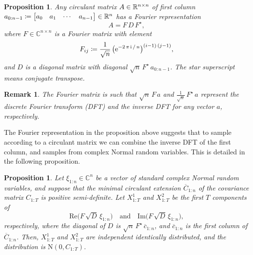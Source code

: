 \documentclass[]{article}
\newtheorem{proposition}[theorem]{Proposition}
\newtheorem{remark}[theorem]{Remark}
\begin{document}
\begin{proposition}
	Any circulant matrix $A\in \mathbb{R}^{n\times n}$ of first column $a_{0:n-1} \coloneqq \begin{bmatrix} a_0 & a_1 & \cdots & a_{n-1} \end{bmatrix} \in \mathbb{R}^n$ has a Fourier representation
	\begin{equation*}
		A = F \, D \, F^\star,
	\end{equation*}
	where $F \in \mathbb{C}^{n \times n}$ is a Fourier matrix with element 
	\begin{equation*}
		F_{ij} \coloneqq \frac{1}{\sqrt{n}} \, \bigl(\mathrm{e}^{-2 \, \pi \, \mathrm{i} \, / \, n} \bigr)^{(i - 1) \, (j - 1)},
	\end{equation*}
	and $D$ is a diagonal matrix with diagonal $\sqrt{n} \, F^\star \, a_{0:n-1}$. The star superscript means conjugate transpose.
\end{proposition}

\begin{remark}
	The Fourier matrix is such that $\sqrt{n} \, F \, a$ and $\frac{1}{\sqrt{n}} \, F^\star \, a$ represent the discrete Fourier transform (DFT) and the inverse DFT for any vector $a$, respectively.
\end{remark}

The Fourier representation in the proposition above suggests that to sample according to a circulant matrix we can combine the inverse DFT of the first column, and samples from complex Normal random variables. This is detailed in the following proposition.

\begin{proposition}
	Let $\xi_{1:n} \in \mathbb{C}^{n}$ be a vector of standard complex Normal random variables, and suppose that the minimal circulant extension $\overline{C}_{1:n}$ of the covariance matrix $C_{1:T}$ is positive semi-definite. Let $X^1_{1:T}$ and $X^2_{1:T}$ be the first $T$ components of 
	\begin{equation*}
		\mathrm{Re} \bigl(F \, \sqrt{D} \, \xi_{1:n} \bigr) \quad \text{and} \quad \mathrm{Im} \bigl(F \, \sqrt{D} \, \xi_{1:n} \bigr),
	\end{equation*}
	respectively, where the diagonal of $D$ is $\sqrt{n} \, F^\star \, \overline{c}_{1:n}$, and $\overline{c}_{1:n}$ is the first column of $\overline{C}_{1:n}$. Then, $X^1_{1:T}$ and $X^2_{1:T}$ are independent identically distributed, and the distribution is $\mathrm{N}(0, C_{1:T})$.
\end{proposition}
\end{document}
